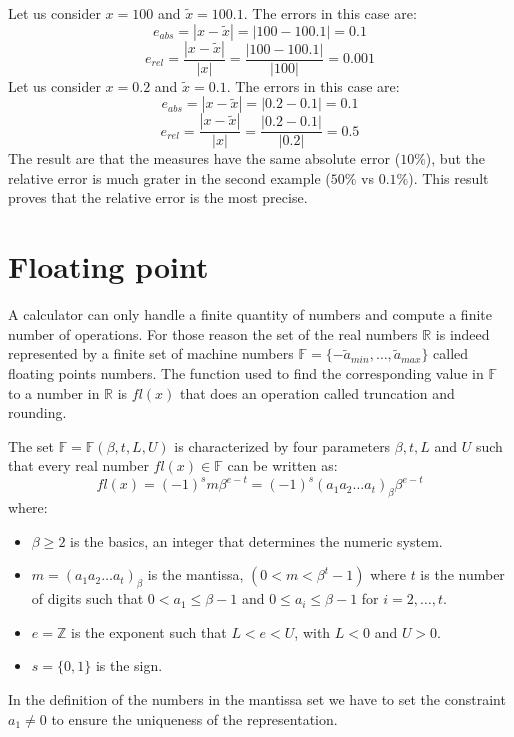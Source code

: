 \documentclass[12pt, a4paper]{report}
\newtheorem[style=M,bodystyle=\normalfont]{theorem}{Theorem}
\newtheorem[style=M,bodystyle=\normalfont]{corollary}{Corollary}
\newtheorem[style=M,bodystyle=\normalfont]{lemma}{Lemma}
\newtheorem[style=M,bodystyle=\normalfont]{definition}{Definition}
\begin{document}
    \begin{example}
        Let us consider $x=100$ and $\tilde{x}=100.1$. The errors in this case are: 
        \[e_{abs}=\left\lvert x - \tilde{x} \right\rvert=\left\lvert 100 - 100.1 \right\rvert=0.1\]
        \[e_{rel}=\dfrac{\left\lvert x - \tilde{x} \right\rvert}{\left\lvert x \right\rvert}=\dfrac{\left\lvert 100 - 100.1 \right\rvert}{\left\lvert 100 \right\rvert}=0.001\]
        Let us consider $x=0.2$ and $\tilde{x}=0.1$. The errors in this case are: 
        \[e_{abs}=\left\lvert x - \tilde{x} \right\rvert=\left\lvert 0.2 - 0.1 \right\rvert=0.1\]
        \[e_{rel}=\dfrac{\left\lvert x - \tilde{x} \right\rvert}{\left\lvert x \right\rvert}=\dfrac{\left\lvert 0.2 - 0.1 \right\rvert}{\left\lvert 0.2 \right\rvert}=0.5\]
        The result are that the measures have the same absolute error ($10\%$), but the relative error is much grater in the second example ($50\%$ vs $0.1\%$).
        This result proves that the relative error is the most precise.
    \end{example}

    \section{Floating point}
    A calculator can only handle a finite quantity of numbers and compute a finite number of operations. For those reason the set of the real numbers 
    $\mathbb{R}$ is indeed represented by a finite set of machine numbers $\mathbb{F}=\{-\tilde{a}_{min}, \dots , \tilde{a}_{max} \}$ called
    floating points numbers. The function used to find the corresponding value in $\mathbb{F}$ to a number in $\mathbb{R}$ is $fl(x)$ that does an 
    operation called truncation and rounding.

    The set $\mathbb{F}=\mathbb{F}(\beta,t,L,U)$ is characterized by four parameters $\beta,t,L$ and $U$ such that every real number $fl(x) \in \mathbb{F}$ 
    can be written as:
    \[fl(x)=(-1)^sm\beta^{e-t}=(-1)^s(a_1a_2\dots a_t)_{\beta}\beta^{e-t}\]
    where:
    \begin{itemize}
        \item $\beta \geq 2$ is the basics, an integer that determines the numeric system. 
        \item $m=(a_1a_2\dots a_t)_{\beta}$ is the mantissa, $(0<m<\beta^t-1)$ where $t$ is the number of digits such that $0<a_1 \leq \beta - 1$
            and $0 \leq a_i \leq \beta - 1$ for $i=2, \dots, t$. 
        \item $e=\mathbb{Z}$ is the exponent such that $L<e<U$, with $L<0$ and $U>0$. 
        \item $s=\{0,1\}$ is the sign. 
    \end{itemize}
    In the definition of the numbers in the mantissa set we have to set the constraint $a_1 \neq 0$ to ensure the uniqueness of the representation. 
\end{document}
